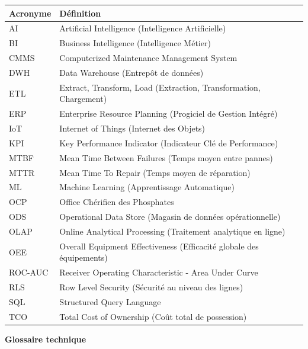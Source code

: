 \documentclass[a4paper,12pt,twoside]{report}
\begin{document}
\begin{longtable}{p{3cm}p{11cm}}
\textbf{Acronyme} & \textbf{Définition} \\
\hline
AI & Artificial Intelligence (Intelligence Artificielle) \\
BI & Business Intelligence (Intelligence Métier) \\
CMMS & Computerized Maintenance Management System \\
DWH & Data Warehouse (Entrepôt de données) \\
ETL & Extract, Transform, Load (Extraction, Transformation, Chargement) \\
ERP & Enterprise Resource Planning (Progiciel de Gestion Intégré) \\
IoT & Internet of Things (Internet des Objets) \\
KPI & Key Performance Indicator (Indicateur Clé de Performance) \\
MTBF & Mean Time Between Failures (Temps moyen entre pannes) \\
MTTR & Mean Time To Repair (Temps moyen de réparation) \\
ML & Machine Learning (Apprentissage Automatique) \\
OCP & Office Chérifien des Phosphates \\
ODS & Operational Data Store (Magasin de données opérationnelle) \\
OLAP & Online Analytical Processing (Traitement analytique en ligne) \\
OEE & Overall Equipment Effectiveness (Efficacité globale des équipements) \\
ROC-AUC & Receiver Operating Characteristic - Area Under Curve \\
RLS & Row Level Security (Sécurité au niveau des lignes) \\
SQL & Structured Query Language \\
TCO & Total Cost of Ownership (Coût total de possession) \\
\end{longtable}

\newpage
\thispagestyle{empty}
\begin{center}
\Large\textbf{Glossaire technique}
\end{center}

\vspace{2cm}
\end{document}
